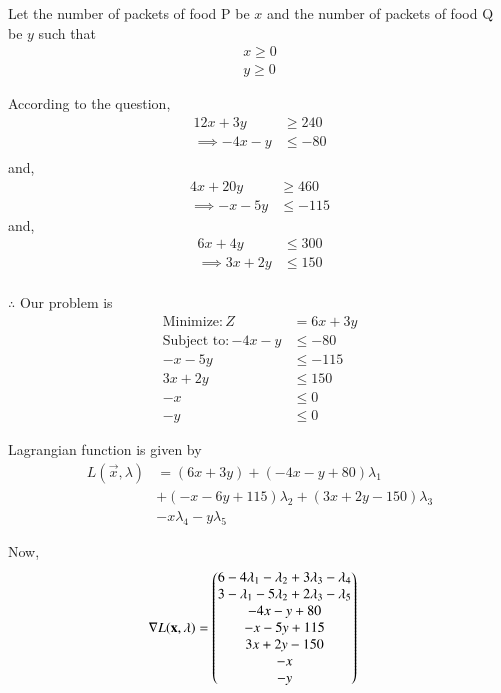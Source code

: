 \documentclass[journal,12pt,twocolumn]{IEEEtran}
\begin{document}
Let the number of packets of food P be $x$ and the number of packets of food Q be $y$  such that 
\begin{align}
    x \geq 0 \\
    y \geq 0 
\end{align}

According to the question,
\begin{align}
    12x+3y &\geq 240 \\
    \implies -4x-y &\leq -80 \\
\end{align}
and,
\begin{align}
    4x+20y &\geq 460 \\
    \implies -x-5y &\leq -115 
\end{align}
and,
\begin{align}
     6x+4y &\leq 300 \\
    \implies 3x+2y &\leq 150 \\
\end{align}

$\therefore$ Our problem is
\begin{align}
    \text{Minimize}:Z &= 6x+3y\\
    \text{Subject to}:
    -4x-y &\leq -80  \label{con1} \\
    -x-5y &\leq -115 \label{con2} \\
    3x+2y &\leq 150 \\
    -x &\leq 0 \\
    -y &\leq 0
\end{align}

Lagrangian function is given by
\begin{equation}
\begin{aligned}
    L(\vec{x},\lambda) &= (6x+3y)+(-4x-y+80)\lambda_1 \\ &+ (-x-6y+115)\lambda_2 +(3x+2y-150)\lambda_3 \\ &- x\lambda_4 -y\lambda_5
\end{aligned}
\end{equation}

Now,
\begin{align}
    \nabla L(\mathbf{x},\lambda) &= \begin{pmatrix}6-4\lambda_1-\lambda_2+3\lambda_3-\lambda_4 \\ 3-\lambda_1-5\lambda_2+2\lambda_3-\lambda_5 \\ -4x-y+80 \\ -x-5y+115 \\ 3x+2y-150 \\ -x \\ -y\end{pmatrix}
\end{align}
\end{document}
